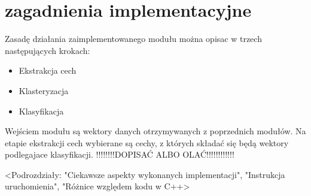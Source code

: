 \section{zagadnienia implementacyjne}

Zasadę działania zaimplementowanego modułu można opisac w trzech następujących krokach:
\begin{itemize}
	\item Ekstrakcja cech
	\item Klasteryzacja
	\item Klasyfikacja
\end{itemize}

Wejściem modułu są wektory danych otrzymywanych z poprzednich modułów. Na etapie ekstrakcji cech wybierane są cechy, z których składać się będą wektory podlegajace klasyfikacji. !!!!!!!!DOPISAĆ ALBO OLAĆ!!!!!!!!!!!!


<Podrozdziały: "Ciekawsze aspekty wykonanych implementacji", "Instrukcja uruchomienia", "Różnice względem kodu w C++>